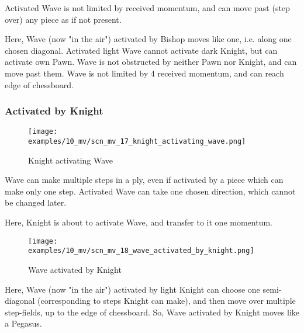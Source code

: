 \vspace*{-0.5\baselineskip}
Activated Wave is not limited by received momentum, and can move past (step over)
any piece as if not present.

Here, Wave (now "in the air") activated by Bishop moves like one, i.e. along one chosen
diagonal. Activated light Wave cannot activate dark Knight, but can activate own Pawn.
Wave is not obstructed by neither Pawn nor Knight, and can move past them. Wave is not
limited by 4 received momentum, and can reach edge of chessboard.

\clearpage %

\subsubsection*{Activated by Knight}
\label{sec:Miranda's veil/Wave/Movement/Activated by Knight}

\vspace*{-1.4\baselineskip}
\noindent
\begin{figure}[h]
\texttt{[image: examples/10\_mv/scn\_mv\_17\_knight\_activating\_wave.png]}
\caption{Knight activating Wave}
\label{fig:scn_mv_17_knight_activating_wave}
\end{figure}

Wave can make multiple steps in a ply, even if activated by a piece which can make only
one step. Activated Wave can take one chosen direction, which cannot be changed later.

Here, Knight is about to activate Wave, and transfer to it one momentum.

\clearpage %

\vspace*{-2.1\baselineskip}
\noindent
\begin{figure}[!h]
\texttt{[image: examples/10\_mv/scn\_mv\_18\_wave\_activated\_by\_knight.png]}
\caption{Wave activated by Knight}
\label{fig:scn_mv_18_wave_activated_by_knight}
\end{figure}

Here, Wave (now "in the air") activated by light Knight can choose one semi-diagonal
(corresponding to steps Knight can make), and then move over multiple step-fields, up
to the edge of chessboard. So, Wave activated by Knight moves like a Pegasus.


